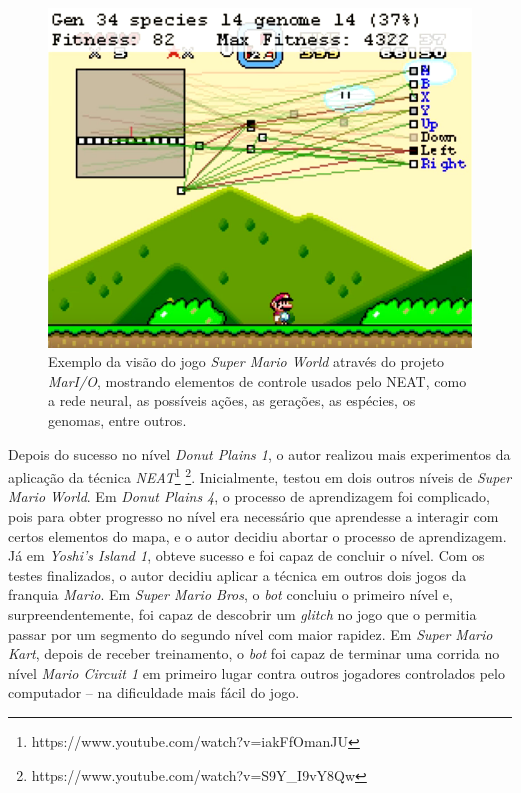 \begin{figure}[htb!]
\centering
\includegraphics[width=.65\textwidth]{fig/mar-io-example.png}
\caption{\label{fig:mar-io-example}Exemplo da visão do jogo \textit{Super
Mario World} através do projeto \textit{MarI/O}, mostrando elementos de
controle usados pelo NEAT, como a rede neural, as possíveis ações, as
gerações, as espécies, os genomas, entre outros.}
\end{figure}

Depois do sucesso no nível \textit{Donut Plains 1}, o autor realizou mais
experimentos da aplicação da técnica
\textit{NEAT}\footnote{https://www.youtube.com/watch?v=iakFfOmanJU}
\footnote{https://www.youtube.com/watch?v=S9Y\_I9vY8Qw}. Inicialmente, testou em
dois outros níveis de \textit{Super Mario World}. Em \textit{Donut Plains 4}, o
processo de aprendizagem foi complicado, pois para obter progresso no nível era
necessário que aprendesse a interagir com certos elementos do mapa, e o autor
decidiu abortar o processo de aprendizagem. Já em \textit{Yoshi's Island 1},
obteve sucesso e foi capaz de concluir o nível. Com os testes finalizados, o
autor decidiu aplicar a técnica em outros dois jogos da franquia \textit{Mario}.
Em \textit{Super Mario Bros}, o \textit{bot} concluiu o primeiro nível e,
surpreendentemente, foi capaz de descobrir um \textit{glitch} no jogo que o
permitia passar por um segmento do segundo nível com maior rapidez. Em
\textit{Super Mario Kart}, depois de receber treinamento, o \textit{bot} foi
capaz de terminar uma corrida no nível \textit{Mario Circuit 1} em primeiro
lugar contra outros jogadores controlados pelo computador -- na dificuldade mais
fácil do jogo.

